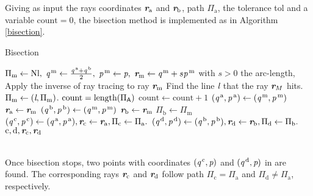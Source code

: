 Giving as input the rays coordinates $\textit{\textbf{r}}_{\textrm{a}}$ and $\textit{\textbf{r}}_{\textrm{b}}$, path $\Pi_\textrm{a}$, the tolerance \textrm{tol} and a variable $\textrm{count} = 0$, the bisection method is implemented as in Algorithm \ref{bisection}.
\begin{algorithm}
\caption{Bisection}\label{bisection}
\begin{algorithmic}[1]
\State $\Pi_{\textrm{m}}\gets \textrm{Nl},$
\State $\textit{q}^{\,\textrm{m}}\gets \frac{\textit{q}^{\,\textrm{a}}+\textit{q}^{\,\textrm{b}}}{2},$ 
\State $\textit{p}^{\,\textrm{m}}\gets\textit{p},$
\State $\textit{\textbf{r}}_{\textrm{m}}\gets \textit{q}^{\,\textrm{m}}+s \textit{p}^{\,\textrm{m}}$ with $s>0$ the arc-length,
\State Apply the inverse of ray tracing to ray $\textit{\textbf{r}}_{\textrm{m}}$
\State Find the line $\textit{l}$ that the ray $\textit{\textbf{r}}_{M}$ hits.
\State $\Pi_{\textrm{m}}\gets (\textit{l},\Pi_{\textrm{m}})$.
$\textrm{count} = \mbox{length}(\Pi_{\textsf{A}})$
\Else \State $\textrm{count}\gets\textrm{count}+1$ 
\EndIf
\EndWhile
{}
\State $(\textit{q}^{\,\textrm{a}}, \textit{p}^{\,\textrm{a}})\gets (\textit{q}^{\,\textrm{m}}, \textit{p}^{\,\textrm{m}})$
\State $\textit{\textbf{r}}_{\textrm{a}}\gets \textit{\textbf{r}}_{\textrm{m}}$
\Else 
\State $(\textit{q}^{\,\textrm{b}}, \textit{p}^{\,\textrm{b}})\gets (\textit{q}^{\,\textrm{m}}, \textit{p}^{\,\textrm{m}})$
\State $\textit{\textbf{r}}_{\textrm{b}}\gets \textit{\textbf{r}}_{\textrm{m}}$
\State $\Pi_\textrm{b}\gets \Pi_{\textrm{m}}$
\EndIf
\EndWhile
\State $(\textit{q}^{\,\textrm{c}}, \textit{p}^{\,\textrm{c}})\gets (\textit{q}^{\,\textrm{a}}, \textit{p}^{\,\textrm{a}}), \textit{\textbf{r}}_{\textrm{c}}\gets \textit{\textbf{r}}_{\textrm{a}}, \Pi_\textrm{c}\gets \Pi_{\textrm{a}}.$
\State $(\textit{q}^{\,\textrm{d}}, \textit{p}^{\,\textrm{d}})\gets (\textit{q}^{\,\textrm{b}}, \textit{p}^{\,\textrm{b}}), \textit{\textbf{r}}_{\textrm{d}}\gets \textit{\textbf{r}}_{\textrm{b}}, \Pi_\textrm{d}\gets \Pi_{\textrm{b}}.$
\State \Return $\textrm{c}, \textrm{d}, \textit{\textbf{r}}_\textrm{c}, \textit{\textbf{r}}_\textrm{d}$
\end{algorithmic}
\end{algorithm}
\\ \indent Once bisection stops, two points with coordinates $(\textit{q}^{\,\textrm{c}}, \textit{p})$ and $(\textit{q}^{\,\textrm{d}}, \textit{p})$ in  are found. The corresponding rays $\textit{\textbf{r}}_{\textrm{c}}$ and $\textit{\textbf{r}}_{\textrm{d}}$ follow path $\Pi_{\textrm{c}}=\Pi_{\textrm{a}}$ and $\Pi_{\textrm{d}}\neq\Pi_{\textrm{a}}$, respectively. 

